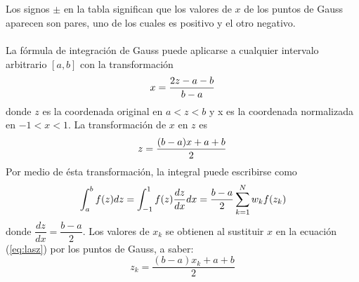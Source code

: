\documentclass[12pt]{article}
\begin{document}
\\
\\
Los signos $\pm$ en la tabla significan que los valores de $x$ de los puntos de Gauss aparecen son pares, uno de los cuales es positivo y el otro negativo.
\\
\\
La fórmula de integración de Gauss puede aplicarse a cualquier intervalo arbitrario $[a,b]$ con la transformación
\begin{equation}{\label{eq:lasx}}
 x = \dfrac{2z-a-b}{b-a}
 \end{equation}
donde $z$ es la coordenada original en $a<z<b$ y x es la coordenada normalizada en $-1<x<1$. La transformación de $x$ en $z$ es
\begin{equation}{\label{eq:lasz}}
 z = \dfrac{(b-a)x+a+b}{2}
\end{equation}
Por medio de ésta transformación, la integral puede escribirse como
\begin{equation}{\label{eq:cambiovar}}
\int_{a}^{b} f(z) dz = \int_{-1}^{1} {f(z)} \dfrac{dz}{dx} dx  = \dfrac{b-a}{2} \sum_{k=1}^{N} w_{k}f(z_{k})
\end{equation}
donde $\dfrac{dz}{dx}=\dfrac{b-a}{2}$. Los valores de $x_{k}$ se obtienen al sustituir $x$ en la ecuación (\ref{eq:lasz}) por los puntos de Gauss, a saber:
\begin{equation}
z_{k} = \dfrac{(b-a)x_{k}+a+b}{2}
\end{equation}
\end{document}

